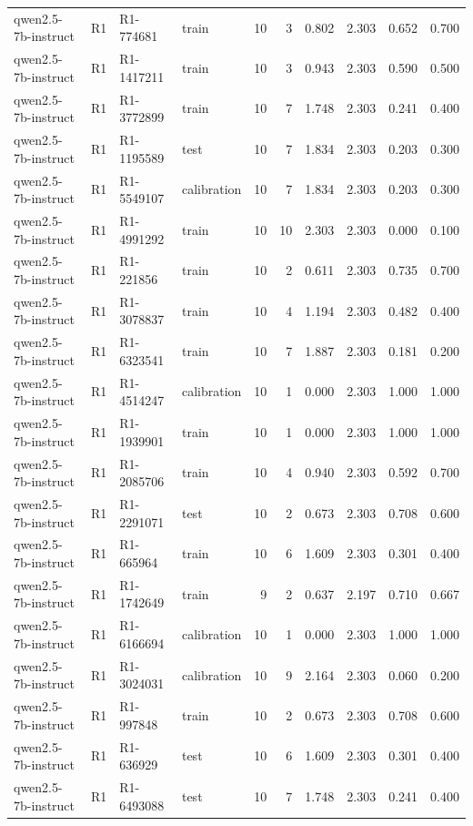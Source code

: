 \begin{table}
\begin{tabular}{llllrrrrrr}
qwen2.5-7b-instruct & R1 & R1-774681 & train & 10 & 3 & 0.802 & 2.303 & 0.652 & 0.700 \\
qwen2.5-7b-instruct & R1 & R1-1417211 & train & 10 & 3 & 0.943 & 2.303 & 0.590 & 0.500 \\
qwen2.5-7b-instruct & R1 & R1-3772899 & train & 10 & 7 & 1.748 & 2.303 & 0.241 & 0.400 \\
qwen2.5-7b-instruct & R1 & R1-1195589 & test & 10 & 7 & 1.834 & 2.303 & 0.203 & 0.300 \\
qwen2.5-7b-instruct & R1 & R1-5549107 & calibration & 10 & 7 & 1.834 & 2.303 & 0.203 & 0.300 \\
qwen2.5-7b-instruct & R1 & R1-4991292 & train & 10 & 10 & 2.303 & 2.303 & 0.000 & 0.100 \\
qwen2.5-7b-instruct & R1 & R1-221856 & train & 10 & 2 & 0.611 & 2.303 & 0.735 & 0.700 \\
qwen2.5-7b-instruct & R1 & R1-3078837 & train & 10 & 4 & 1.194 & 2.303 & 0.482 & 0.400 \\
qwen2.5-7b-instruct & R1 & R1-6323541 & train & 10 & 7 & 1.887 & 2.303 & 0.181 & 0.200 \\
qwen2.5-7b-instruct & R1 & R1-4514247 & calibration & 10 & 1 & 0.000 & 2.303 & 1.000 & 1.000 \\
qwen2.5-7b-instruct & R1 & R1-1939901 & train & 10 & 1 & 0.000 & 2.303 & 1.000 & 1.000 \\
qwen2.5-7b-instruct & R1 & R1-2085706 & train & 10 & 4 & 0.940 & 2.303 & 0.592 & 0.700 \\
qwen2.5-7b-instruct & R1 & R1-2291071 & test & 10 & 2 & 0.673 & 2.303 & 0.708 & 0.600 \\
qwen2.5-7b-instruct & R1 & R1-665964 & train & 10 & 6 & 1.609 & 2.303 & 0.301 & 0.400 \\
qwen2.5-7b-instruct & R1 & R1-1742649 & train & 9 & 2 & 0.637 & 2.197 & 0.710 & 0.667 \\
qwen2.5-7b-instruct & R1 & R1-6166694 & calibration & 10 & 1 & 0.000 & 2.303 & 1.000 & 1.000 \\
qwen2.5-7b-instruct & R1 & R1-3024031 & calibration & 10 & 9 & 2.164 & 2.303 & 0.060 & 0.200 \\
qwen2.5-7b-instruct & R1 & R1-997848 & train & 10 & 2 & 0.673 & 2.303 & 0.708 & 0.600 \\
qwen2.5-7b-instruct & R1 & R1-636929 & test & 10 & 6 & 1.609 & 2.303 & 0.301 & 0.400 \\
qwen2.5-7b-instruct & R1 & R1-6493088 & test & 10 & 7 & 1.748 & 2.303 & 0.241 & 0.400 \\

\end{tabular}
\end{table}
